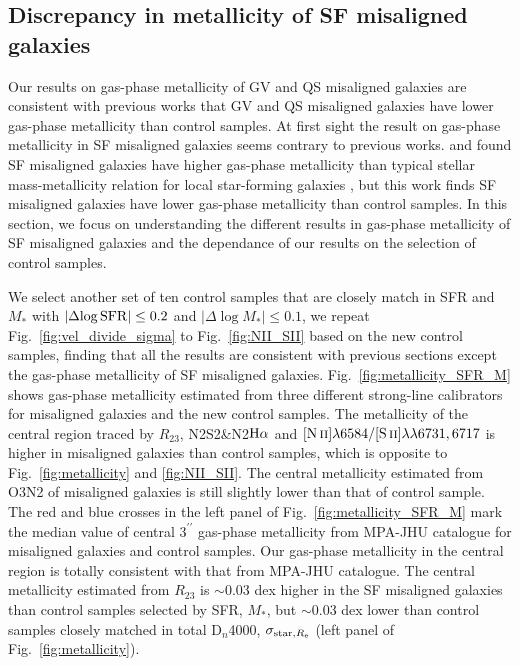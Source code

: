 \subsection{Discrepancy in metallicity of SF misaligned galaxies}
\label{sec:discussion-1}
Our results on gas-phase metallicity of GV and QS misaligned galaxies are consistent with previous works \citep{chen_growth_2016, jin_sdss-iv_2016} that GV and QS misaligned galaxies have lower gas-phase metallicity than control samples. At first sight the result on gas-phase metallicity in SF misaligned galaxies seems contrary to previous works. \citet{chen_growth_2016} and \citet{jin_sdss-iv_2016} found SF misaligned galaxies have higher gas-phase metallicity than typical stellar mass-metallicity relation for local star-forming galaxies \citep{tremonti_origin_2004}, but this work finds SF misaligned galaxies have lower gas-phase metallicity than control samples. In this section, we focus on understanding the different results in gas-phase metallicity of SF misaligned galaxies and the dependance of our results on the selection of control samples.

We select another set of ten control samples that are closely match in SFR and $M_*$ with $|\Delta{\rm \log{SFR}}| \leq 0.2$ and $|\Delta{\log{M_*}}| \leq 0.1$, we repeat Fig.~\ref{fig:vel_divide_sigma} to Fig.~\ref{fig:NII_SII} based on the new control samples, finding that all the results are consistent with previous sections except the gas-phase metallicity of SF misaligned galaxies. Fig.~\ref{fig:metallicity_SFR_M} shows gas-phase metallicity estimated from three different strong-line calibrators for misaligned galaxies and the new control samples. The metallicity of the central region traced by $R_{23}$, N2S2\&N2$\hbox{H$\alpha$}$ and $\hbox{[N\,{\sc ii}]}\lambda6584/\hbox{[S\,{\sc ii}]}\lambda\lambda6731,6717$ is higher in misaligned galaxies than control samples, which is opposite to Fig.~\ref{fig:metallicity} and \ref{fig:NII_SII}. The central metallicity estimated from O3N2 of misaligned galaxies is still slightly lower than that of control sample. The red and blue crosses in the left panel of Fig.~\ref{fig:metallicity_SFR_M} mark the median value of central $3^{\prime \prime}$ gas-phase metallicity from MPA-JHU catalogue for misaligned galaxies and control samples. Our gas-phase metallicity in the central region is totally consistent with that from MPA-JHU catalogue. The central metallicity estimated from $R_{23}$ is $\sim$0.03 dex higher in the SF misaligned galaxies than control samples selected by SFR, $M_*$, but $\sim$0.03 dex lower than control samples closely matched in total D$_n$4000, $\sigma_{{\rm star}, R_{\rm e}}$ (left panel of Fig.~\ref{fig:metallicity}).

